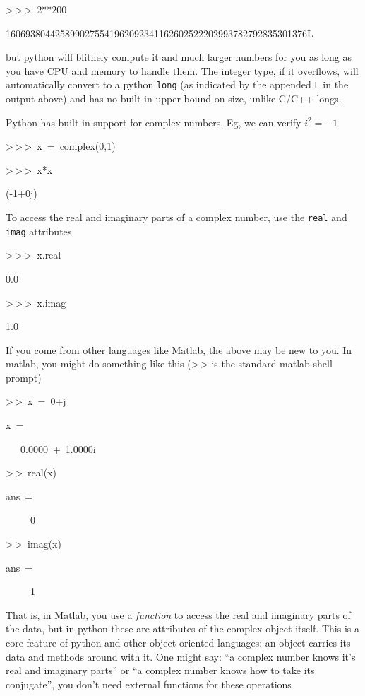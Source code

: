 \begin{lyxcode}
>\,{}>\,{}>~2{*}{*}200

1606938044258990275541962092341162602522202993782792835301376L
\end{lyxcode}
but python will blithely compute it and much larger numbers for you
as long as you have CPU and memory to handle them. The integer type,
if it overflows, will automatically convert to a python \texttt{long}
(as indicated by the appended \texttt{L} in the output above) and
has no built-in upper bound on size, unlike C/C++ longs.

Python has built in support for complex numbers. Eg, we can verify
$i^{2}=-1$ 

\begin{lyxcode}
>\,{}>\,{}>~x~=~complex(0,1)

>\,{}>\,{}>~x{*}x

(-1+0j)
\end{lyxcode}
To access the real and imaginary parts of a complex number, use the
\texttt{real} and \texttt{imag} attributes

\begin{lyxcode}
>\,{}>\,{}>~x.real

0.0

>\,{}>\,{}>~x.imag

1.0
\end{lyxcode}
If you come from other languages like Matlab, the above may be new
to you. In matlab, you might do something like this (>\,{}> is the
standard matlab shell prompt)

\begin{lyxcode}
>\,{}>~x~=~0+j

x~=

~~~0.0000~+~1.0000i



>\,{}>~real(x)

ans~=

~~~~~0



>\,{}>~imag(x)

ans~=

~~~~~1




\end{lyxcode}
That is, in Matlab, you use a \textit{function} to access the real
and imaginary parts of the data, but in python these are attributes
of the complex object itself. This is a core feature of python and
other object oriented languages: an object carries its data and methods
around with it. One might say: {}``a complex number knows it's real
and imaginary parts'' or {}``a complex number knows how to take
its conjugate'', you don't need external functions for these operations

